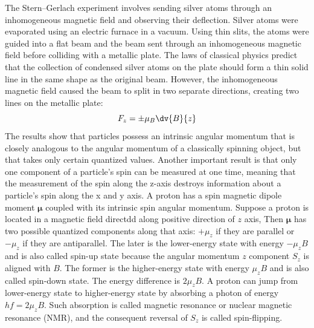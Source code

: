 \documentclass[a4paper,12pt]{report}
\begin{document}
The Stern–Gerlach experiment involves sending silver atoms through an inhomogeneous magnetic field and observing their deflection. Silver atoms were evaporated using an electric furnace in a vacuum. Using thin slits, the atoms were guided into a flat beam and the beam sent through an inhomogeneous magnetic field before colliding with a metallic plate. The laws of classical physics predict that the collection of condensed silver atoms on the plate should form a thin solid line in the same shape as the original beam. However, the inhomogeneous magnetic field caused the beam to split in two separate directions, creating two lines on the metallic plate:
\[F_z=\pm\mu_B\dv{B}{z}\]
The results show that particles possess an intrinsic angular momentum that is closely analogous to the angular momentum of a classically spinning object, but that takes only certain quantized values. Another important result is that only one component of a particle's spin can be measured at one time, meaning that the measurement of the spin along the z-axis destroys information about a particle's spin along the x and y axis.
A proton has a spin magnetic dipole moment $\boldsymbol{\mu}$ coupled with its intrinsic spin angular momentum. Suppose a proton is located in a magnetic field directdd along positive direction of $z$ axis, Then $\boldsymbol{\mu}$ has two possible quantized components along that axis: $+\mu_z$ if they are parallel or $-\mu_z$ if they are antiparallel. The later is the lower-energy state with energy $-\mu_zB$ and is also called spin-up state because the angular momentum $z$ component $S_z$ is aligned with $B$. The former is the higher-energy state with energy $\mu_zB$ and is also called spin-down state. The energy difference is $2\mu_zB$. A proton can jump from lower-energy state to higher-energy state by absorbing a photon of energy $hf=2\mu_zB$. Such absorption is called magnetic resonance or nuclear magnetic resonance (NMR), and the consequent reversal of $S_z$ is called spin-flipping.
\end{document}
